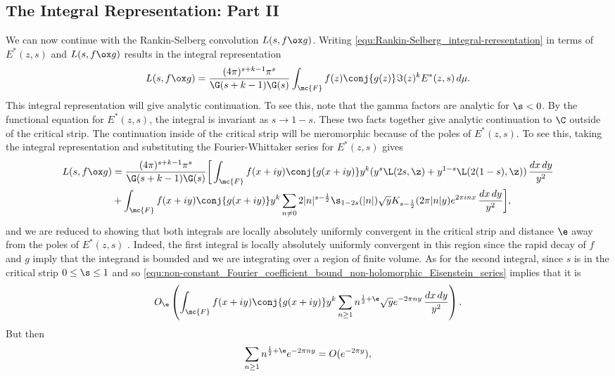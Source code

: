     \subsection*{The Integral Representation: Part II}
      We can now continue with the Rankin-Selberg convolution $L(s,f \ox g)$. Writing \cref{equ:Rankin-Selberg_integral-reresentation} in terms of $E^{\ast}(z,s)$ and $L(s,f \ox g)$ results in the integral representation
      \[
        L(s,f \ox g) = \frac{(4\pi)^{s+k-1}\pi^{s}}{\G(s+k-1)\G(s)}\int_{\mc{F}}f(z)\conj{g(z)}\Im(z)^{k}E^{\ast}(z,s)\,d\mu.
      \]
      This integral representation will give analytic continuation. To see this, note that the gamma factors are analytic for $\s < 0$. By the functional equation for $E^{\ast}(z,s)$, the integral is invariant as $s \to 1-s$. These two facts together give analytic continuation to $\C$ outside of the critical strip. The continuation inside of the critical strip will be meromorphic because of the poles of $E^{\ast}(z,s)$. To see this, taking the integral representation and substituting the Fourier-Whittaker series for $E^{\ast}(z,s)$ gives
      \begin{equation}\label{equ:integral_representation_Rankin_Selberg}
        \begin{aligned}
          L(s,f \ox g) &= \frac{(4\pi)^{s+k-1}\pi^{s}}{\G(s+k-1)\G(s)}\bigg[\int_{\mc{F}}f(x+iy)\conj{g(x+iy)}y^{k}(y^{s}\L(2s,\z)+y^{1-s}\L(2(1-s),\z))\,\frac{dx\,dy}{y^{2}} \\
          &+\int_{\mc{F}}f(x+iy)\conj{g(x+iy)}y^{k}\sum_{n \neq 0}2|n|^{s-\frac{1}{2}}\s_{1-2s}(|n|)\sqrt{y}K_{s-\frac{1}{2}}(2\pi|n|y)e^{2\pi inx}\,\frac{dx\,dy}{y^{2}}\bigg],
        \end{aligned}
      \end{equation}
      and we are reduced to showing that both integrals are locally absolutely uniformly convergent in the critical strip and distance $\e$ away from the poles of $E^{\ast}(z,s)$ . Indeed, the first integral is locally absolutely uniformly convergent in this region since the rapid decay of $f$ and $g$ imply that the integrand is bounded and we are integrating over a region of finite volume. As for the second integral, since $s$ is in the critical strip $0 \le \s \le 1$ and so \cref{equ:non-constant_Fourier_coefficient_bound_non-holomorphic_Eisenstein_series} implies that it is
      \[
        O_{\e}\left(\int_{\mc{F}}f(x+iy)\conj{g(x+iy)}y^{k}\sum_{n \ge 1}n^{\frac{1}{2}+\e}\sqrt{y}e^{-2\pi ny}\,\frac{dx\,dy}{y^{2}}\right).
      \]
      But then
      \[
        \sum_{n \ge 1}n^{\frac{1}{2}+\e}e^{-2\pi ny} = O(e^{-2\pi y}),
      \]

